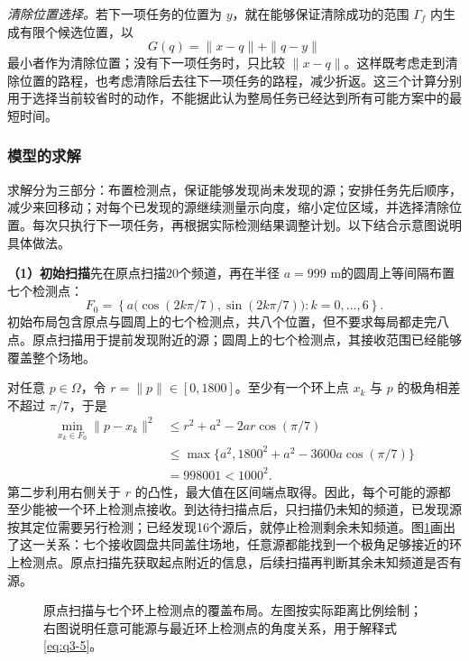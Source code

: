 \emph{清除位置选择。}若下一项任务的位置为 $y$，就在能够保证清除成功的范围 $\Gamma_f$ 内生成有限个候选位置，以
\begin{equation}\label{eq:q3-through-clear}
G(q)=\|x-q\|+\|q-y\|
\end{equation}
最小者作为清除位置；没有下一项任务时，只比较 $\|x-q\|$。这样既考虑走到清除位置的路程，也考虑清除后去往下一项任务的路程，减少折返。这三个计算分别用于选择当前较省时的动作，不能据此认为整局任务已经达到所有可能方案中的最短时间。

\Needspace{30mm}
\subsubsection{模型的求解}\label{sec:q3-3}

求解分为三部分：布置检测点，保证能够发现尚未发现的源；安排任务先后顺序，减少来回移动；对每个已发现的源继续测量示向度，缩小定位区域，并选择清除位置。每次只执行下一项任务，再根据实际检测结果调整计划。以下结合示意图说明具体做法。

\textbf{（1）初始扫描}先在原点扫描20个频道，再在半径 $a=999$ m的圆周上等间隔布置七个检测点：
\begin{equation}\label{eq:q3-4}
F_0=\left\{a\bigl(\cos(2k\pi/7),\sin(2k\pi/7)\bigr):k=0,\ldots,6\right\}.
\end{equation}
初始布局包含原点与圆周上的七个检测点，共八个位置，但不要求每局都走完八点。原点扫描用于提前发现附近的源；圆周上的七个检测点，其接收范围已经能够覆盖整个场地。

对任意 $p\in\Omega$，令 $r=\|p\|\in[0,1800]$。至少有一个环上点 $x_k$ 与 $p$ 的极角相差不超过 $\pi/7$，于是
\begin{equation}\label{eq:q3-5}
\begin{aligned}
\min_{x_k\in F_0}\|p-x_k\|^2
&\le r^2+a^2-2ar\cos(\pi/7)\\
&\le \max\{a^2,1800^2+a^2-3600a\cos(\pi/7)\}\\
&=998001<1000^2.
\end{aligned}
\end{equation}
第二步利用右侧关于 $r$ 的凸性，最大值在区间端点取得。因此，每个可能的源都至少能被一个环上检测点接收。到达待扫描点后，只扫描仍未知的频道，已发现源按其定位需要另行检测；已经发现16个源后，就停止检测剩余未知频道。图\ref{fig:q3-coverage}画出了这一关系：七个接收圆盘共同盖住场地，任意源都能找到一个极角足够接近的环上检测点。原点扫描先获取起点附近的信息，后续扫描再判断其余未知频道是否有源。

\begin{figure}[!htbp]
\centering
\QThreeCoverageFigure
\caption{原点扫描与七个环上检测点的覆盖布局。左图按实际距离比例绘制；右图说明任意可能源与最近环上检测点的角度关系，用于解释式\eqref{eq:q3-5}。}
\label{fig:q3-coverage}
\end{figure}


